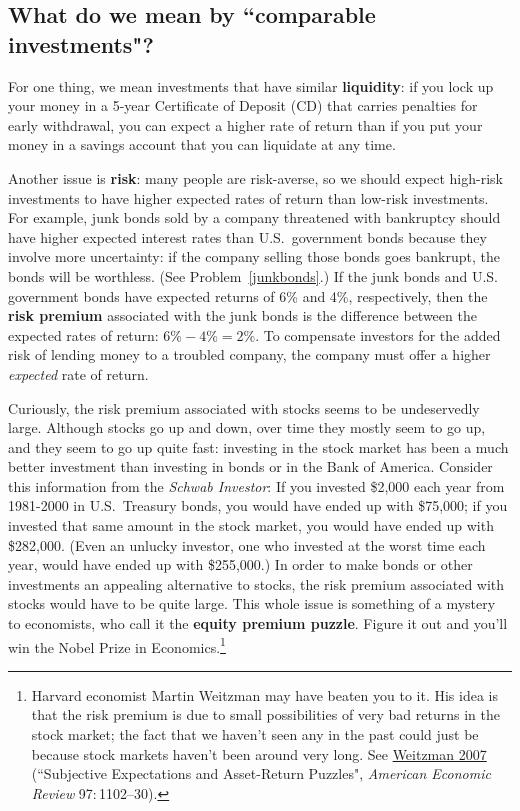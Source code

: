 \subsection*{What do we mean by ``comparable investments"?}

For one thing, we mean investments that have similar \textbf{liquidity}: if you lock up your money in a 5-year Certificate of Deposit (CD) that carries penalties for early withdrawal, you can expect a higher rate of return than if you put your money in a savings account that you can liquidate at any time.

Another issue is \textbf{risk}: many people are risk-averse, so we should expect high-risk investments to have higher expected rates of return than low-risk investments. For example, junk bonds sold by a company threatened with bankruptcy should have higher expected interest rates than U.S.\ government bonds because they involve more uncertainty: if the company selling those bonds goes bankrupt, the bonds will be worthless. (See Problem~\ref{junkbonds}.) If the junk bonds and U.S. government bonds have expected returns of 6\% and 4\%, respectively, then the \textbf{risk premium} associated with the junk bonds is the difference between the expected rates of return: $6\% - 4\% = 2\%.$ To compensate investors for the added risk of lending money to a troubled company, the company must offer a higher \emph{expected} rate of return.


Curiously, the risk premium associated with stocks seems to be undeservedly large. Although stocks go up and down, over time they mostly seem to go up, and they seem to go up quite fast: investing in the stock market has been a much better investment than investing in bonds or in the Bank of America. Consider this information from the \emph{Schwab Investor}: If you invested \$2,000 each year from 1981-2000 in U.S.\ Treasury bonds, you would have ended up with \$75,000; if you invested that same amount in the stock market, you would have ended up with \$282,000. (Even an unlucky investor, one who invested at the worst time each year, would have ended up with \$255,000.) In order to make bonds or other investments an appealing alternative to stocks, the risk premium associated with stocks would have to be quite large. This whole issue is something of a mystery to economists, who call it the \textbf{equity premium puzzle}. Figure it out and you'll win the Nobel Prize in Economics.\footnote{Harvard economist Martin Weitzman may have beaten you to it. His idea is that the risk premium is due to small possibilities of very bad returns in the stock market; the fact that we haven't seen any in the past could just be because stock markets haven't been around very long. See \href{http://www.aeaweb.org/articles.php?doi=10.1257/aer.97.4.1102}{Weitzman 2007} (``Subjective Expectations and Asset-Return Puzzles", \emph{American Economic Review} 97:\,1102--30).}

